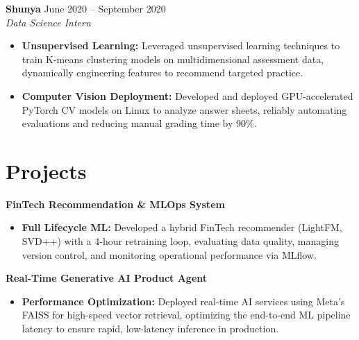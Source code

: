 \documentclass[11pt,a4paper]{article}
\begin{document}
\vspace{3pt}
\noindent
\textbf{Shunya} \hfill June 2020 -- September 2020 \\
\textit{Data Science Intern}
\begin{itemize}[leftmargin=*,noitemsep,topsep=0pt]
    \item \textbf{Unsupervised Learning:} Leveraged unsupervised learning techniques to train K-means clustering models on multidimensional assessment data, dynamically engineering features to recommend targeted practice.
    \item \textbf{Computer Vision Deployment:} Developed and deployed GPU-accelerated PyTorch CV models on Linux to analyze answer sheets, reliably automating evaluations and reducing manual grading time by 90\%.
\end{itemize}

\vspace{-5pt}
\section{Projects}
\noindent
\textbf{FinTech Recommendation \& MLOps System}
\begin{itemize}[leftmargin=*,noitemsep,topsep=0pt]
    \item \textbf{Full Lifecycle ML:} Developed a hybrid FinTech recommender (LightFM, SVD++) with a 4-hour retraining loop, evaluating data quality, managing version control, and monitoring operational performance via MLflow.
\end{itemize}

\vspace{3pt}
\noindent
\textbf{Real-Time Generative AI Product Agent}
\begin{itemize}[leftmargin=*,noitemsep,topsep=0pt]
    \item \textbf{Performance Optimization:} Deployed real-time AI services using Meta’s FAISS for high-speed vector retrieval, optimizing the end-to-end ML pipeline latency to ensure rapid, low-latency inference in production.
\end{itemize}
\end{document}
